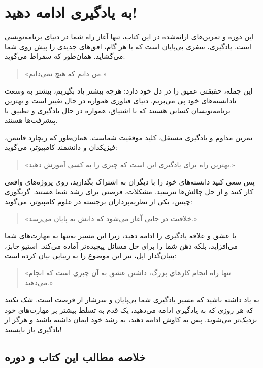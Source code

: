 \documentclass[b5paper,12pt]{article}
\begin{document}
	\section*{به یادگیری ادامه دهید!}

	این دوره و تمرین‌های ارائه‌شده در این کتاب، تنها آغاز راه شما در دنیای برنامه‌نویسی است. یادگیری، سفری بی‌پایان است که با هر گام، افق‌های جدیدی را پیش روی شما می‌گشاید. همان‌طور که سقراط می‌گوید:

	\begin{quote}
	«من دانم که هیچ نمی‌دانم.»
	\end{quote}

	این جمله، حقیقتی عمیق را در دل خود دارد: هرچه بیشتر یاد بگیریم، بیشتر به وسعت نادانسته‌های خود پی می‌بریم. دنیای فناوری همواره در حال تغییر است و بهترین برنامه‌نویسان کسانی هستند که با اشتیاق، همواره در حال یادگیری و تطبیق با پیشرفت‌ها هستند.

	تمرین مداوم و یادگیری مستقل، کلید موفقیت شماست. همان‌طور که ریچارد فاینمن، فیزیکدان و دانشمند کامپیوتر، می‌گوید:

	\begin{quote}
	«بهترین راه برای یادگیری این است که چیزی را به کسی آموزش دهید.»
	\end{quote}

	پس سعی کنید دانسته‌های خود را با دیگران به اشتراک بگذارید، روی پروژه‌های واقعی کار کنید و از حل چالش‌ها نترسید. مشکلات، فرصتی برای رشد شما هستند. گریگوری چیتین، یکی از نظریه‌پردازان برجسته در علوم کامپیوتر، می‌گوید:

	\begin{quote}
	«خلاقیت در جایی آغاز می‌شود که دانش به پایان می‌رسد.»
	\end{quote}

	با عشق و علاقه یادگیری را ادامه دهید، زیرا این مسیر نه‌تنها به مهارت‌های شما می‌افزاید، بلکه ذهن شما را برای حل مسائل پیچیده‌تر آماده می‌کند. استیو جابز، بنیان‌گذار اپل، نیز این موضوع را به زیبایی بیان کرده است:

	\begin{quote}
	«تنها راه انجام کارهای بزرگ، داشتن عشق به آن چیزی است که انجام می‌دهید.»
	\end{quote}

	به یاد داشته باشید که مسیر یادگیری شما بی‌پایان و سرشار از فرصت است. شک نکنید که هر روزی که به یادگیری ادامه می‌دهید، یک قدم به تسلط بیشتر بر مهارت‌های خود نزدیک‌تر می‌شوید. پس به کاوش ادامه دهید، به رشد خود ایمان داشته باشید و هرگز از یادگیری باز نایستید!

	\subsection*{خلاصه مطالب این کتاب و دوره}
	
\end{document}
